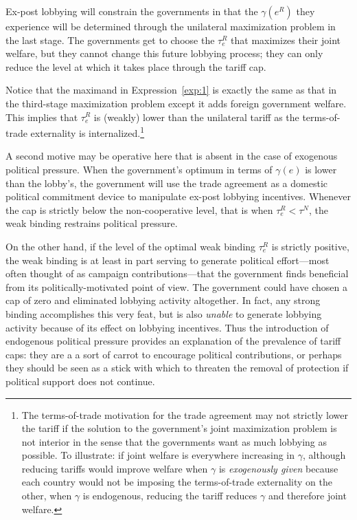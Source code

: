 \documentclass[12pt]{article}
\newcommand{\ga}{\gamma}
\begin{document}
Ex-post lobbying will constrain the governments in that the $\ga\left(e^R\right)$ they experience will be determined through the unilateral maximization problem in the last stage. The governments get to choose the $\tau_e^R$ that maximizes their joint welfare, but they cannot change this future lobbying process; they can only reduce the level at which it takes place through the tariff cap.

Notice that the maximand in Expression~\ref{exp:1} is exactly the same as that in the third-stage maximization problem except it adds  foreign government welfare. This implies that $\tau_e^R$ is (weakly) lower than the unilateral tariff as the terms-of-trade externality is internalized.\footnote{The terms-of-trade motivation for the trade agreement may not strictly lower the tariff if the solution to the government's joint maximization problem is not interior in the sense that the governments want as much lobbying as possible. To illustrate: if joint welfare is everywhere increasing in $\ga$, although reducing tariffs would improve welfare when $\ga$ is \textit{exogenously given} because each country would not be imposing the terms-of-trade externality on the other, when $\ga$ is endogenous, reducing the tariff reduces $\ga$ and therefore joint welfare.\label{fn:tot}}

A second motive may be operative here that is absent in the case of exogenous political pressure. When the government's optimum in terms of $\ga(e)$ is lower than the lobby's, the government will use the trade agreement as a domestic political commitment device to manipulate ex-post lobbying incentives. Whenever the cap is strictly below the non-cooperative level, that is when $\tau_e^R < \tau^N$, the weak binding restrains political pressure.

On the other hand, if the level of the optimal weak binding $\tau_e^R$ is strictly positive, the weak binding is at least in part serving to generate political effort---most often thought of as campaign contributions---that the government finds beneficial from its politically-motivated point of view. The government could have chosen a cap of zero and eliminated lobbying activity altogether. In fact, any strong binding accomplishes this very feat, but is also \textit{unable} to generate lobbying activity because of its effect on lobbying incentives. Thus the introduction of endogenous political pressure provides an explanation of the prevalence of tariff caps: they are a a sort of carrot to encourage political contributions, or perhaps they should be seen as a stick with which to threaten the removal of protection if political support does not continue.
\end{document}

